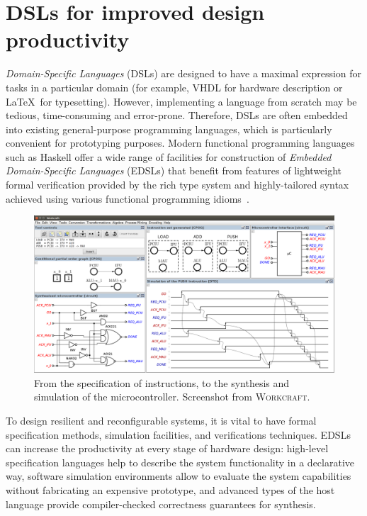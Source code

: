 \documentclass[conference]{IEEEtran}
\begin{document}
\section{DSLs for improved design productivity\label{sec:dsl}}

\emph{Domain-Specific Languages} (DSLs) are designed to have a maximal expression for
tasks in a particular domain (for example, VHDL for hardware description or
\LaTeX~for typesetting). However, implementing a language from scratch may be tedious,
time-consuming and error-prone. Therefore, DSLs are often embedded into existing general-purpose programming languages, which is particularly convenient for
prototyping purposes.
Modern functional programming languages such as Haskell offer a
wide range of facilities for construction of \emph{Embedded Domain-Specific Languages}
(EDSLs) that benefit from features of lightweight formal verification provided by
the rich type system and highly-tailored syntax achieved using various functional
programming idioms~\cite{HudakDSLs}.

\begin{figure}[ht!]
\begin{center}
    \includegraphics[width=0.95\linewidth]{FIG/screen.png}
    \vspace{-2mm}
    \caption{From the specification of instructions, to the synthesis and simulation
    of the microcontroller. Screenshot from \textsc{Workcraft}.}
    \label{fig:screenshot}
\end{center}
\vspace{-6mm}
\end{figure}

To design resilient and reconfigurable systems, it is vital to have formal
specification methods, simulation facilities, and verifications techniques.
EDSLs can increase the productivity at every stage of hardware design:
high-level specification
languages help to describe the system functionality in a declarative way, software
simulation environments allow to evaluate the system capabilities
without fabricating an expensive prototype, and advanced types of the host language
provide compiler-checked correctness guarantees for synthesis.
\end{document}
